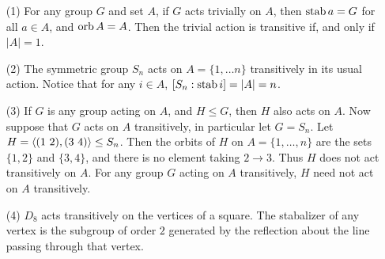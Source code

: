 \begin{example}\label{}
    \begin{enumerate}
        \item[(1)] For any group $G$ and set  $A$, if  $G$ acts trivially on
            $A$, then  $\operatorname{stab}{a}=G$ for all $a \in A$, and  $\operatorname{orb}{A}=A$. Then
        the trivial action is transitive if, and only if $|A|=1$.

    \item[(2)] The symmetric group $S_n$ acts on  $A=\{1, \dots n\}$
        transitively in its usual action. Notice that for any $i \in A$,
        $[S_n:\operatorname{stab}{i}]=|A|=n$.

    \item[(3)] If $G$ is any group acting on $A$, and  $H \leq G$, then  $H$
        also acts on $A$. Now suppose that  $G$ acts on  $A$ transitively, in
        particular let $G=S_n$. Let  $H=\langle (1 \ 2),(3 \ 4)\rangle \leq S_n$. Then
        the orbits of  $H$ on  $A=\{1, \dots, n\}$ are the sets $\{1,2\}$ and
        $\{3,4\}$, and there is no element taking $2 \rightarrow 3$. Thus $H$
        does not act transitively on $A$. For any group $G$ acting on  $A$
        transitively,  $H$ need not act on  $A$ transitively.

    \item[(4)] $D_8$ acts transitively on the vertices of a square. The
        stabalizer of any vertex is the subgroup of order $2$ generated by the
        reflection about the line passing through that vertex.
    \end{enumerate}
\end{example}

